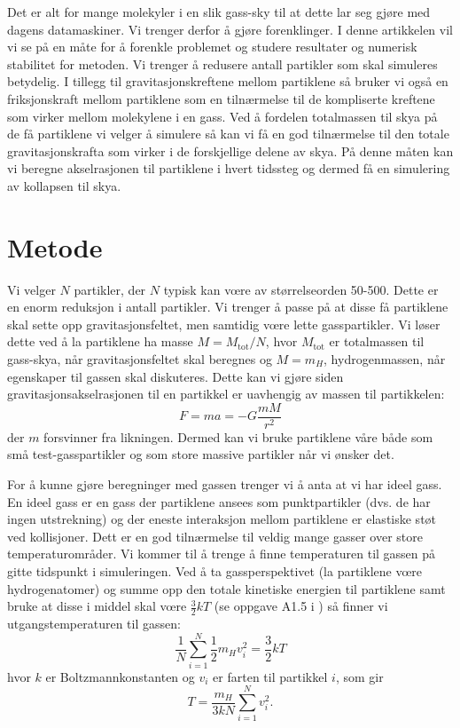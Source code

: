\documentclass[reprint,english,notitlepage]{revtex4-1}  %
\begin{document}
Det er alt for mange molekyler i en slik gass-sky til at dette lar seg
gjøre med dagens datamaskiner. Vi trenger derfor å gjøre forenklinger. I denne artikkelen vil vi
se på en måte for å forenkle problemet og studere resultater og numerisk stabilitet for metoden.
Vi trenger å redusere antall partikler som skal simuleres betydelig. I tillegg til
gravitasjonskreftene mellom partiklene så bruker vi også en friksjonskraft mellom partiklene som en
tilnærmelse til de kompliserte kreftene som virker mellom molekylene i en gass. 
Ved å fordelen totalmassen til skya på de få partiklene vi velger å simulere så kan vi få en god tilnærmelse
til den totale gravitasjonskrafta som virker i de forskjellige delene av skya. På denne måten kan vi beregne
akselrasjonen til partiklene i hvert tidssteg og dermed få en simulering av kollapsen til skya.

\section{Metode}

 Vi velger $N$ partikler, der $N$ typisk kan vœre av størrelseorden 50-500. Dette er en enorm reduksjon i antall partikler. Vi trenger å passe på at disse få partiklene skal sette opp gravitasjonsfeltet, men samtidig vœre lette gasspartikler. Vi løser dette ved å la partiklene ha masse $M=M_\mathrm{tot}/N$, hvor $M_\mathrm{tot}$ er totalmassen til gass-skya, når gravitasjonsfeltet skal beregnes og $M=m_H$, hydrogenmassen, når egenskaper til gassen skal diskuteres. Dette kan vi gjøre siden gravitasjonsakselrasjonen til en partikkel er uavhengig av massen til partikkelen:
\[
F=ma=-G\frac{mM}{r^2}
\]
der $m$ forsvinner fra likningen. Dermed kan vi bruke partiklene våre både som små test-gasspartikler og som store massive partikler når vi ønsker det.


For å kunne gjøre beregninger med gassen trenger vi å anta at vi har ideel gass. En ideel gass er en gass der partiklene ansees som punktpartikler (dvs. de har ingen utstrekning) og der eneste interaksjon mellom partiklene er elastiske støt ved kollisjoner. Dett er en god tilnærmelse til veldig mange gasser over store temperaturområder. Vi kommer til å trenge å finne temperaturen til gassen på gitte tidspunkt i simuleringen. Ved å ta gassperspektivet (la partiklene vœre hydrogenatomer) og summe opp den totale kinetiske energien til partiklene samt bruke at disse i middel skal vœre $\frac{3}{2}kT$ (se oppgave A1.5 i \citep{part1A}) så finner vi utgangstemperaturen til gassen:
\[
\frac{1}{N}\sum_{i=1}^N\frac{1}{2}m_Hv_i^2=\frac{3}{2}kT
\]
hvor $k$ er Boltzmannkonstanten og $v_i$ er farten til partikkel $i$, som gir
\[
T=\frac{m_H}{3kN}\sum_{i=1}^Nv_i^2.
\]
\end{document}
